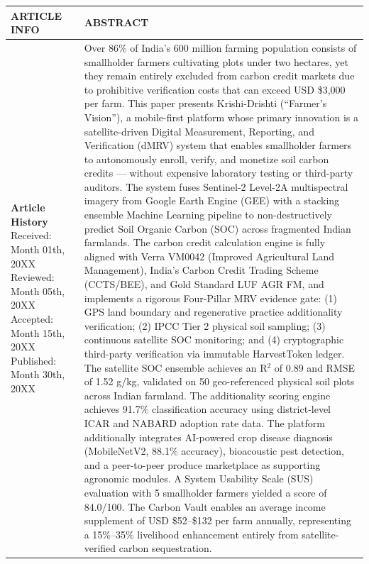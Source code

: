 \documentclass[10pt,a4paper]{article}
\begin{document}
\vspace{0.4cm}

\noindent\begin{tabularx}{\textwidth}{@{}p{} X@{}}
\toprule
\textbf{ARTICLE INFO} & \textbf{ABSTRACT} \\
\midrule
\textbf{Article History} \newline
Received: Month 01th, 20XX \newline
Reviewed: Month 05th, 20XX \newline
Accepted: Month 15th, 20XX \newline
Published: Month 30th, 20XX
&
Over 86\% of India's 600 million farming population consists of smallholder farmers cultivating plots under two hectares, yet they remain entirely excluded from carbon credit markets due to prohibitive verification costs that can exceed USD \$3,000 per farm. This paper presents Krishi-Drishti (``Farmer's Vision''), a mobile-first platform whose primary innovation is a satellite-driven Digital Measurement, Reporting, and Verification (dMRV) system that enables smallholder farmers to autonomously enroll, verify, and monetize soil carbon credits — without expensive laboratory testing or third-party auditors. The system fuses Sentinel-2 Level-2A multispectral imagery from Google Earth Engine (GEE) with a stacking ensemble Machine Learning pipeline to non-destructively predict Soil Organic Carbon (SOC) across fragmented Indian farmlands. The carbon credit calculation engine is fully aligned with Verra VM0042 (Improved Agricultural Land Management), India's Carbon Credit Trading Scheme (CCTS/BEE), and Gold Standard LUF AGR FM, and implements a rigorous Four-Pillar MRV evidence gate: (1) GPS land boundary and regenerative practice additionality verification; (2) IPCC Tier 2 physical soil sampling; (3) continuous satellite SOC monitoring; and (4) cryptographic third-party verification via immutable HarvestToken ledger. The satellite SOC ensemble achieves an R$^2$ of 0.89 and RMSE of 1.52 g/kg, validated on 50 geo-referenced physical soil plots across Indian farmland. The additionality scoring engine achieves 91.7\% classification accuracy using district-level ICAR and NABARD adoption rate data. The platform additionally integrates AI-powered crop disease diagnosis (MobileNetV2, 88.1\% accuracy), bioacoustic pest detection, and a peer-to-peer produce marketplace as supporting agronomic modules. A System Usability Scale (SUS) evaluation with 5 smallholder farmers yielded a score of 84.0/100. The Carbon Vault enables an average income supplement of USD \$52--\$132 per farm annually, representing a 15\%--35\% livelihood enhancement entirely from satellite-verified carbon sequestration. \\

\end{tabularx}
\end{document}
